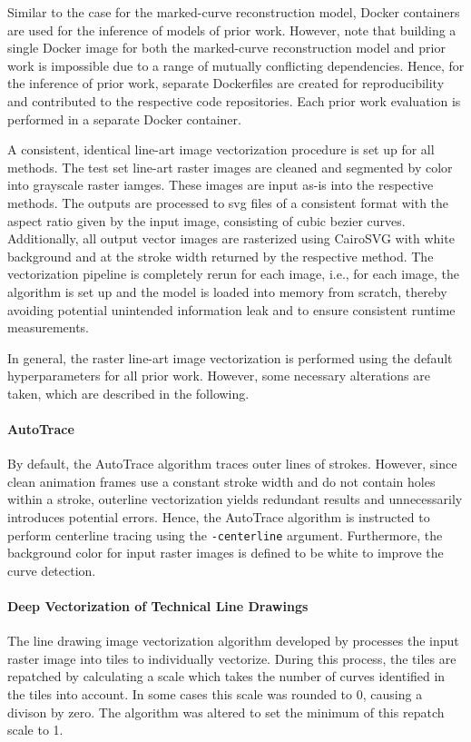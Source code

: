 Similar to the case for the marked-curve reconstruction model, Docker containers are used for the inference of models of prior work. However, note that building a single Docker image for both the marked-curve reconstruction model and prior work is impossible due to a range of mutually conflicting dependencies. Hence, for the inference of prior work, separate Dockerfiles are created for reproducibility and contributed to the respective code repositories. Each prior work evaluation is performed in a separate Docker container.

A consistent, identical line-art image vectorization procedure is set up for all methods. The test set line-art raster images are cleaned and segmented by color into grayscale raster iamges. These images are input as-is into the respective methods. The outputs are processed to \gls{svg} files of a consistent format with the aspect ratio given by the input image, consisting of cubic bezier curves. Additionally, all output vector images are rasterized using CairoSVG \citep{cairosvg} with white background and at the stroke width returned by the respective method. The vectorization pipeline is completely rerun for each image, i.e., for each image, the algorithm is set up and the model is loaded into memory from scratch, thereby avoiding potential unintended information leak and to ensure consistent runtime measurements.

In general, the raster line-art image vectorization is performed using the default hyperparameters for all prior work. However, some necessary alterations are taken, which are described in the following.

\paragraph{AutoTrace \citep{autotrace}}
By default, the AutoTrace algorithm \citep{autotrace} traces outer lines of strokes. However, since clean animation frames use a constant stroke width and do not contain holes within a stroke, outerline vectorization yields redundant results and unnecessarily introduces potential errors. Hence, the AutoTrace algorithm is instructed to perform centerline tracing using the \texttt{-centerline} argument. Furthermore, the background color for input raster images is defined to be white to improve the curve detection.

\paragraph{Deep Vectorization of Technical Line Drawings \citep{DBLP:conf/eccv/EgiazarianVAVST20}}
The line drawing image vectorization algorithm developed by \citet{DBLP:conf/eccv/EgiazarianVAVST20} processes the input raster image into tiles to individually vectorize. During this process, the tiles are repatched by calculating a scale which takes the number of curves identified in the tiles into account. In some cases this scale was rounded to 0, causing a divison by zero. The algorithm was altered to set the minimum of this repatch scale to 1.

